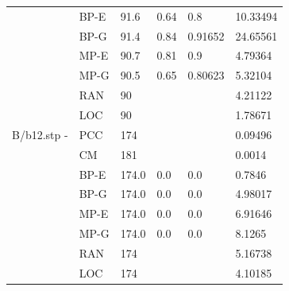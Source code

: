\documentclass[12pt,a4paper]{article}
\begin{document}
\begin{center}
\begin{tabular}{l|l|l|l|l|l}
		&BP-E&91.6&0.64&0.8&10.33494\\
		&BP-G&91.4&0.84&0.91652&24.65561\\
		&MP-E&90.7&0.81&0.9&4.79364\\
		&MP-G&90.5&0.65&0.80623&5.32104\\
		&RAN&90&&&4.21122\\
		&LOC&90&&&1.78671\\\hline
		B/b12.stp - &PCC&174&&&0.09496\\
		&CM&181&&&0.0014\\
		&BP-E&174.0&0.0&0.0&0.7846\\
		&BP-G&174.0&0.0&0.0&4.98017\\
		&MP-E&174.0&0.0&0.0&6.91646\\
		&MP-G&174.0&0.0&0.0&8.1265\\
		&RAN&174&&&5.16738\\
		&LOC&174&&&4.10185\\\hline
	\end{tabular}
\end{center}
\end{document}
